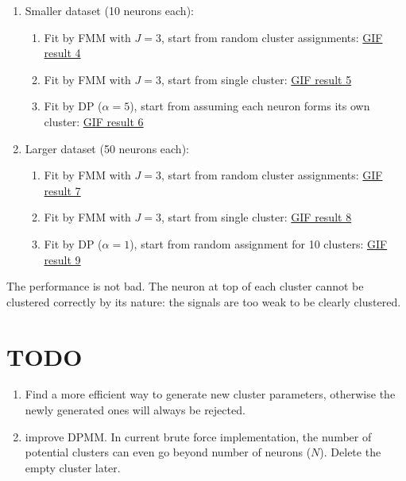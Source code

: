 \documentclass[]{article}
\begin{document}
\begin{enumerate}
	\def\labelenumi{(\arabic{enumi})}
	\item
	Smaller dataset (10 neurons each):\\
	\begin{enumerate}
		\def\labelenumi{\alph{enumi}.}
		\item
		Fit by FMM with \(J = 3\), start from random cluster assignments:
		\href{https://github.com/weigcdsb/state-space-clustering/blob/main/results/gif/noA_10_MM_above.gif}{GIF result 4}
		\item
		Fit by FMM with \(J = 3\), start from single cluster:
		\href{https://github.com/weigcdsb/state-space-clustering/blob/main/results/gif/noA_10_MM_below.gif}{GIF result 5}
		\item
		Fit by DP (\(\alpha = 5\)), start from assuming each neuron forms its own cluster:
		\href{https://github.com/weigcdsb/state-space-clustering/blob/main/results/gif/noA_10_DP_above_5.gif}{GIF result 6}
	\end{enumerate}
	
	\item
	Larger dataset (50 neurons each):\\
	\begin{enumerate}
		\def\labelenumi{\alph{enumi}.}
		\item
		Fit by FMM with \(J = 3\), start from random cluster assignments:
		\href{https://github.com/weigcdsb/state-space-clustering/blob/main/results/gif/noA_50_MM_above.gif}{GIF result 7}
		\item
		Fit by FMM with \(J = 3\), start from single cluster:
		\href{https://github.com/weigcdsb/state-space-clustering/blob/main/results/gif/noA_50_MM_below.gif}{GIF result 8}
		\item
		Fit by DP (\(\alpha = 1\)), start from random assignment for 10 clusters:
		\href{https://github.com/weigcdsb/state-space-clustering/blob/main/results/gif/noA_50_DP_above1.gif}{GIF result 9}
	\end{enumerate}
\end{enumerate}

The performance is not bad. The neuron at top of each cluster cannot be clustered correctly by its nature: the signals are too weak to be clearly clustered.

\section{TODO}
\begin{enumerate}
	\def\labelenumi{(\arabic{enumi})}
	\item
	Find a more efficient way to generate new cluster parameters, otherwise the newly generated ones will always be rejected.
	\item
	improve DPMM. In current brute force implementation, the number of potential clusters can even go beyond number of neurons (\(N\)). Delete the empty cluster later.
\end{enumerate}
\end{document}
